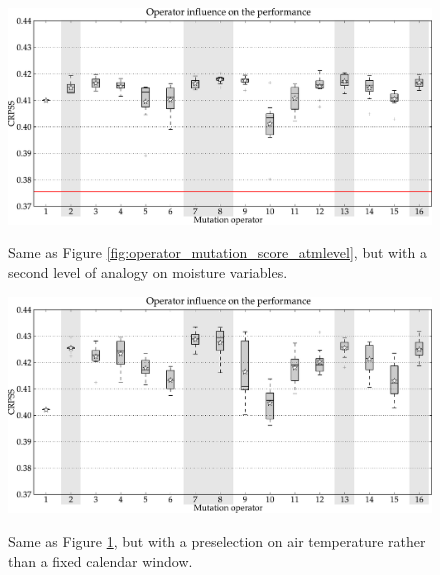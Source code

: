 \documentclass[twocol]{ametsoc}
\begin{document}
\begin{figure}[htb]
	\begin{center}
		\noindent\includegraphics[width=14cm,angle=0]{figures/operator_mutation_score_r2.pdf}\\
	\end{center}
	\caption{Same as Figure \ref{fig:operator_mutation_score_atmlevel}, but with a second level of analogy on moisture variables.}
	\label{fig:operator_mutation_score_r2}
\end{figure}

\begin{figure}[htb]
	\begin{center}
		\noindent\includegraphics[width=14cm,angle=0]{figures/operator_mutation_score_r4.pdf}\\
	\end{center}
	\caption{Same as Figure \ref{fig:operator_mutation_score_r2}, but with a preselection on air temperature rather than a fixed calendar window.}
	\label{fig:operator_mutation_score_r4}
\end{figure}
\end{document}

